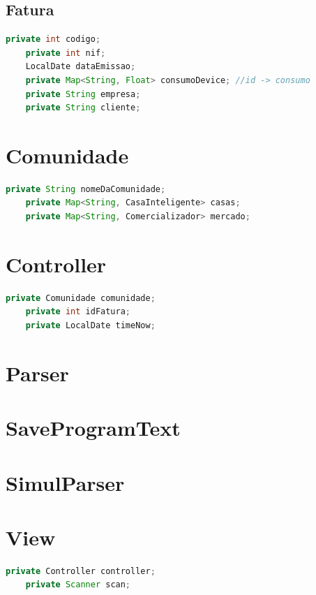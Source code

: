 \documentclass[11pt,a4paper]{report}
\begin{document}
	\subsection{Fatura}
	\begin{lstlisting}[language=java,firstnumber=1]
    private int codigo;
    private int nif;
    LocalDate dataEmissao;
    private Map<String, Float> consumoDevice; //id -> consumo
    private String empresa;
    private String cliente;
    \end{lstlisting}
	
	\section{Comunidade}
	\begin{lstlisting}[language=java,firstnumber=1]
    private String nomeDaComunidade;
    private Map<String, CasaInteligente> casas;
    private Map<String, Comercializador> mercado;
    \end{lstlisting}
	
	\section{Controller}
	\begin{lstlisting}[language=java,firstnumber=1]
    private Comunidade comunidade;
    private int idFatura;
    private LocalDate timeNow;
    \end{lstlisting}
	
    \section{Parser}
    
    \section{SaveProgramText}
    
    \section{SimulParser}
    
    \section{View}
    \begin{lstlisting}[language=java,firstnumber=1]
    private Controller controller;
    private Scanner scan;
    \end{lstlisting}
    
\end{document}
